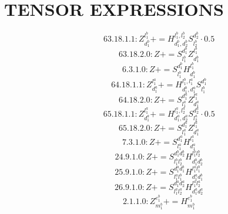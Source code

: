 \documentclass[letterpaper,10pt,fleqn,leqno,onecolumn]{article}
\begin{document}
\section{TENSOR EXPRESSIONS}
\begin{equation} \;\;\;\;\;\;  63.18.1.1: Z^{l_{1}^{b}}_{d_{1}^{b}}+=H^{l_{1}^{b},l_{2}^{b}}_{d_{1}^{b},d_{2}^{b}}S^{d_{2}^{b}}_{l_{2}^{b}}\cdot 0.5 \end{equation}
\begin{equation} \;\;\;\;\;\;  63.18.2.0: Z+=S^{d_{1}^{b}}_{l_{1}^{b}}Z^{l_{1}^{b}}_{d_{1}^{b}} \end{equation}
\begin{equation} \;\;\;\;\;\;  6.3.1.0: Z+=S^{d_{1}^{b}}_{l_{1}^{b}}H^{l_{1}^{b}}_{d_{1}^{b}} \end{equation}
\begin{equation} \;\;\;\;\;\;  64.18.1.1: Z^{l_{1}^{a}}_{d_{1}^{a}}+=H^{l_{1}^{b},l_{1}^{a}}_{d_{1}^{b},d_{1}^{a}}S^{d_{1}^{b}}_{l_{1}^{b}} \end{equation}
\begin{equation} \;\;\;\;\;\;  64.18.2.0: Z+=S^{d_{1}^{a}}_{l_{1}^{a}}Z^{l_{1}^{a}}_{d_{1}^{a}} \end{equation}
\begin{equation} \;\;\;\;\;\;  65.18.1.1: Z^{l_{1}^{a}}_{d_{1}^{a}}+=H^{l_{1}^{a},l_{2}^{a}}_{d_{1}^{a},d_{2}^{a}}S^{d_{2}^{a}}_{l_{2}^{a}}\cdot 0.5 \end{equation}
\begin{equation} \;\;\;\;\;\;  65.18.2.0: Z+=S^{d_{1}^{a}}_{l_{1}^{a}}Z^{l_{1}^{a}}_{d_{1}^{a}} \end{equation}
\begin{equation} \;\;\;\;\;\;  7.3.1.0: Z+=S^{d_{1}^{a}}_{l_{1}^{a}}H^{l_{1}^{a}}_{d_{1}^{a}} \end{equation}
\begin{equation} \;\;\;\;\;\;  24.9.1.0: Z+=S^{d_{1}^{b}d_{2}^{b}}_{l_{1}^{b}l_{2}^{b}}H^{l_{1}^{b}l_{2}^{b}}_{d_{1}^{b}d_{2}^{b}} \end{equation}
\begin{equation} \;\;\;\;\;\;  25.9.1.0: Z+=S^{d_{1}^{a}d_{1}^{b}}_{l_{1}^{a}l_{1}^{b}}H^{l_{1}^{a}l_{1}^{b}}_{d_{1}^{a}d_{1}^{b}} \end{equation}
\begin{equation} \;\;\;\;\;\;  26.9.1.0: Z+=S^{d_{1}^{a}d_{2}^{a}}_{l_{1}^{a}l_{2}^{a}}H^{l_{1}^{a}l_{2}^{a}}_{d_{1}^{a}d_{2}^{a}} \end{equation}
\begin{equation} \;\;\;\;\;\;  2.1.1.0: Z^{e_{1}^{b}}_{m_{1}^{b}}+=H^{e_{1}^{b}}_{m_{1}^{b}} \end{equation}
\end{document}
